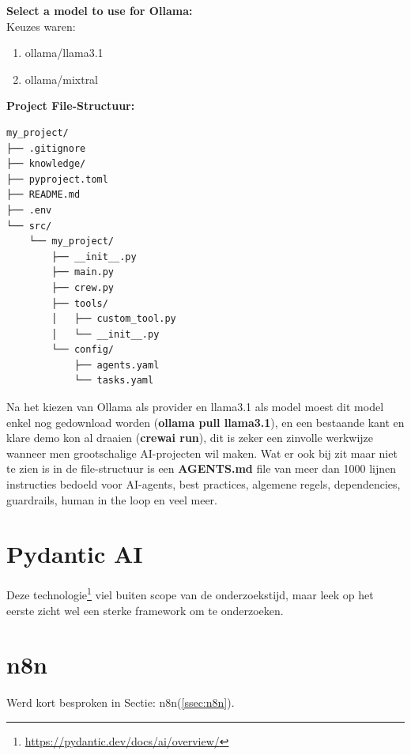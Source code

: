 \textbf{Select a model to use for Ollama:} \\
Keuzes waren:
\begin{enumerate}
    \item ollama/llama3.1
    \item ollama/mixtral
\end{enumerate}


\textbf{Project File-Structuur:}
\label{verb:filetree}
\begin{tcolorbox}[colback=gray!20, colframe=gray!80]
    \begin{verbatim}
my_project/  
├── .gitignore  
├── knowledge/  
├── pyproject.toml  
├── README.md  
├── .env  
└── src/  
    └── my_project/  
        ├── __init__.py  
        ├── main.py  
        ├── crew.py  
        ├── tools/  
        │   ├── custom_tool.py  
        │   └── __init__.py  
        └── config/  
            ├── agents.yaml  
            └── tasks.yaml  
    \end{verbatim}
\end{tcolorbox}

Na het kiezen van Ollama als provider en llama3.1 als model moest dit model enkel nog gedownload worden (\textbf{ollama pull llama3.1}), en een bestaande kant en klare demo kon al draaien (\textbf{crewai run}), dit is zeker een zinvolle werkwijze wanneer men grootschalige AI-projecten wil maken. Wat er ook bij zit maar niet te zien is in de file-structuur is een \textbf{AGENTS.md} file van meer dan 1000 lijnen instructies bedoeld voor AI-agents, best practices, algemene regels, dependencies, guardrails, human in the loop en veel meer. \\

\section{Pydantic AI}
\label{sec:pydanticai}
Deze technologie\footnote{\href{https://pydantic.dev/docs/ai/overview/}{https://pydantic.dev/docs/ai/overview/}} viel buiten scope van de onderzoekstijd, maar leek op het eerste zicht wel een sterke framework om te onderzoeken.

\section{n8n}
\label{sec:n8n}

Werd kort besproken in Sectie: n8n(\ref{ssec:n8n}).

